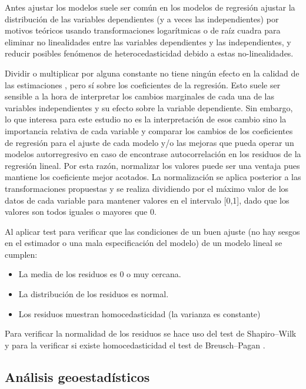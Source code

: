 \documentclass[12pt,]{book}
\providecommand{\tightlist}{%
  \setlength{\itemsep}{0pt}\setlength{\parskip}{0pt}}
\begin{document}
Antes ajustar los modelos suele ser común en los modelos de regresión
ajustar la distribución de las variables dependientes (y a veces las
independientes) por motivos teóricos usando transformaciones
logarítmicas o de raíz cuadra para eliminar no linealidades entre las
variables dependientes y las independientes, y reducir posibles
fenómenos de heterocedasticidad debido a estas no-linealidades.

Dividir o multiplicar por alguna constante no tiene ningún efecto en la
calidad de las estimaciones , pero sí sobre los coeficientes de la
regresión. Esto suele ser sensible a la hora de interpretar los cambios
marginales de cada una de las variables independientes y su efecto sobre
la variable dependiente. Sin embargo, lo que interesa para este estudio
no es la interpretación de esos cambio sino la importancia relativa de
cada variable y comparar los cambios de los coeficientes de regresión
para el ajuste de cada modelo y/o las mejoras que pueda operar un
modelos autorregresivo en caso de encontrase autocorrelación en los
residuos de la regresión lineal. Por esta razón, normalizar los valores
puede ser una ventaja pues mantiene los coeficiente mejor acotados. La
normalización se aplica posterior a las transformaciones propuestas y se
realiza dividiendo por el máximo valor de los datos de cada variable
para mantener valores en el intervalo {[}0,1{]}, dado que los valores
son todos iguales o mayores que 0.

Al aplicar test para verificar que las condiciones de un buen ajuste (no
hay sesgos en el estimador o una mala especificación del modelo) de un
modelo lineal se cumplen:

\begin{itemize}
\tightlist
\item
  La media de los residuos es 0 o muy cercana.
\item
  La distribución de los residuos es normal.
\item
  Los residuos muestran homocedasticidad (la varianza es constante)
\end{itemize}

Para verificar la normalidad de los residuos se hace uso del test de
Shapiro--Wilk \citep[ ]{shapiro1965analysis} y para la verificar si
existe homocedasticidad el test de Breusch--Pagan
\citep{breusch1979simple}.

\subsection{Análisis geoestadísticos}\label{geostat}
\end{document}
